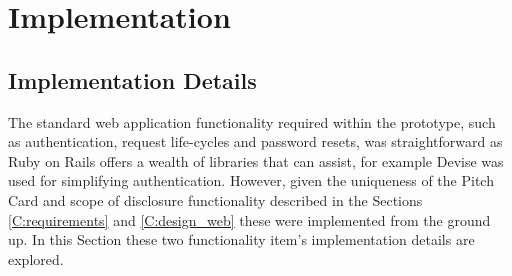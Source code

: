 \chapter{Implementation}\label{C:webApplicationImplementation}

\section{Implementation Details}
The standard web application functionality required within the prototype, such as authentication, request life-cycles and password resets, was straightforward as Ruby on Rails offers a wealth of libraries that can assist, for example Devise \cite{Devise:online} was used for simplifying authentication. However, given the uniqueness of the Pitch Card and scope of disclosure functionality described in the Sections \ref{C:requirements} and \ref{C:design_web} these were implemented from the ground up. In this Section these two functionality item's implementation details are explored.

